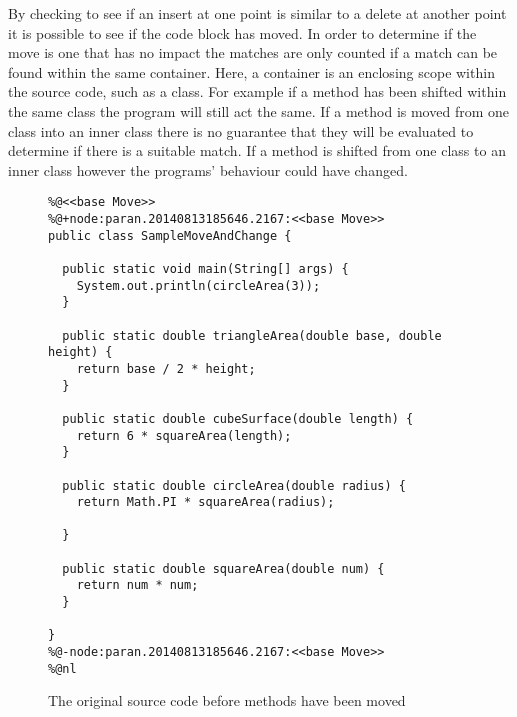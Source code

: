 By checking to see if an insert at one point is similar to a delete at another point it is possible to see if the code block has moved. In order to determine if the move is one that has no impact the matches are only counted if a match can be found within the same container.  Here, a container is an enclosing scope within the source code, such as a class. For example if a method has been shifted within the same class the program will still act the same.  If a method is moved from one class into an inner class there is no guarantee that they will be evaluated to determine if there is a suitable match.  If a method is shifted from one class to an inner class however the programs' behaviour could have changed.

\begin{figure}[!t]
\begin{lstlisting}
%@<<base Move>>
%@+node:paran.20140813185646.2167:<<base Move>>
public class SampleMoveAndChange {

  public static void main(String[] args) {
    System.out.println(circleArea(3));
  }

  public static double triangleArea(double base, double height) {
    return base / 2 * height;
  }

  public static double cubeSurface(double length) {
    return 6 * squareArea(length);
  }

  public static double circleArea(double radius) {
    return Math.PI * squareArea(radius);

  }

  public static double squareArea(double num) {
    return num * num;
  }

}
%@-node:paran.20140813185646.2167:<<base Move>>
%@nl
\end{lstlisting}
\caption{The original source code before methods have been moved}
 \label{fig:orig}
\end{figure}

